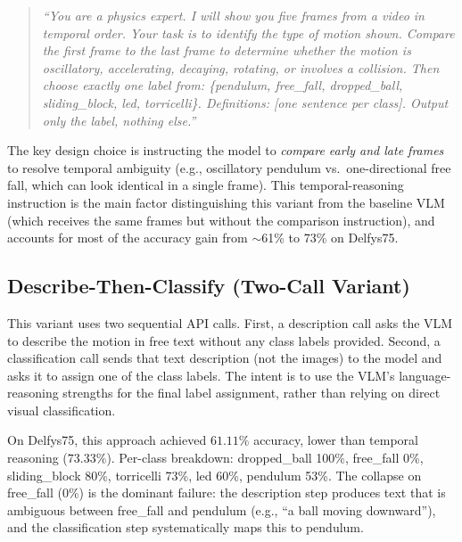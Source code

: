 \documentclass[runningheads]{llncs}
\begin{document}
\begin{quote}\small
\textit{``You are a physics expert. I will show you five frames from a video
in temporal order. Your task is to identify the type of motion shown.
Compare the first frame to the last frame to determine whether the motion
is oscillatory, accelerating, decaying, rotating, or involves a collision.
Then choose exactly one label from: \{pendulum, free\_fall, dropped\_ball,
sliding\_block, led, torricelli\}. Definitions: [one sentence per class].
Output only the label, nothing else.''}
\end{quote}

The key design choice is instructing the model to \emph{compare early and
late frames} to resolve temporal ambiguity (e.g., oscillatory pendulum vs.\
one-directional free fall, which can look identical in a single frame).
This temporal-reasoning instruction is the main factor distinguishing this
variant from the baseline VLM (which receives the same frames but without
the comparison instruction), and accounts for most of the accuracy gain
from $\sim$61\% to 73\% on Delfys75.

\subsection{Describe-Then-Classify (Two-Call Variant)}
\label{app:vlm_dtc}

This variant uses two sequential API calls.  First, a description call asks
the VLM to describe the motion in free text without any class labels
provided.  Second, a classification call sends that text description (not
the images) to the model and asks it to assign one of the class labels.
The intent is to use the VLM's language-reasoning strengths for the final
label assignment, rather than relying on direct visual classification.

On Delfys75, this approach achieved $61.11\%$ accuracy, lower than temporal reasoning ($73.33\%$). Per-class breakdown:
dropped\_ball 100\%, free\_fall 0\%, sliding\_block 80\%, torricelli 73\%,
led 60\%, pendulum 53\%.
The collapse on free\_fall (0\%) is the dominant failure: the description
step produces text that is ambiguous between free\_fall and pendulum
(e.g., ``a ball moving downward''), and the classification step systematically
maps this to pendulum.
\end{document}
